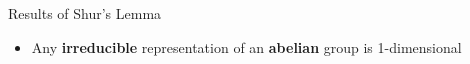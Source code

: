 \begin{frame}{Results of Shur's Lemma}
    \large
    \begin{itemize}
        \item Any \textbf{irreducible} representation of an \textbf{abelian} group is 1-dimensional
    \end{itemize}
    
    \normalsize

\end{frame}
